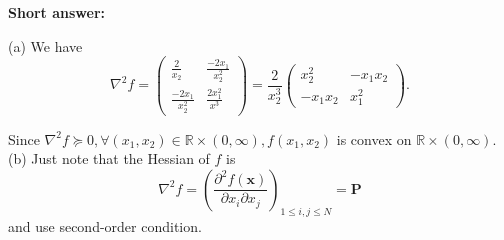 \textbf{Short answer:}

(a) We have
\[
\nabla^2 f=\left(\begin{array}{cc}
	\frac{2}{x_2} & \frac{-2 x_1}{x_2^2} \\
	\frac{-2 x_1}{x_2^2} & \frac{2 x_1^2}{x^3}
\end{array}\right)=\frac{2}{x_2^3}\left(\begin{array}{cc}
	x_2^2 & -x_1 x_2 \\
	-x_1 x_2 & x_1^2
\end{array}\right) .
\]

Since \(\nabla^2 f \succeq 0, \forall\left(x_1, x_2\right) \in \mathbb{R} \times(0, \infty), f\left(x_1, x_2\right)\) is convex on \(\mathbb{R} \times(0, \infty)\).
(b) Just note that the Hessian of \(f\) is
\[
\nabla^2 f=\left(\frac{\partial^2 f(\boldsymbol{x})}{\partial x_i \partial x_j}\right)_{1 \leq i, j \leq N}= \boldsymbol{P}
\]
and use second-order condition.


